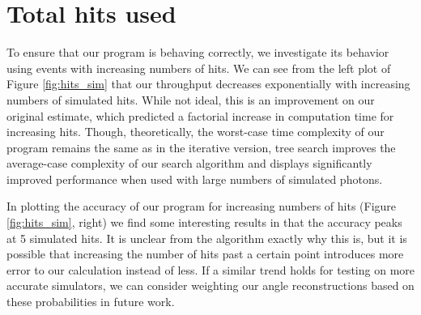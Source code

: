 
\section{Total hits used}
\label{totalhits}
To ensure that our program is behaving correctly, we investigate its behavior using events with increasing numbers of hits. We can see from the left plot of Figure \ref{fig:hits_sim} that our throughput decreases exponentially with increasing numbers of simulated hits. While not ideal, this is an improvement on our original estimate, which predicted a factorial increase in computation time for increasing hits. Though, theoretically, the worst-case time complexity of our program remains the same as in the iterative version, tree search improves the average-case complexity of our search algorithm and displays significantly improved performance when used with large numbers of simulated photons.

In plotting the accuracy of our program for increasing numbers of hits (Figure \ref{fig:hits_sim}, right) we find some interesting results in that the accuracy peaks at 5 simulated hits. It is unclear from the algorithm exactly why this is, but it is possible that increasing the number of hits past a certain point introduces more error to our calculation instead of less. If a similar trend holds for testing on more accurate simulators, we can consider weighting our angle reconstructions based on these probabilities in future work.

